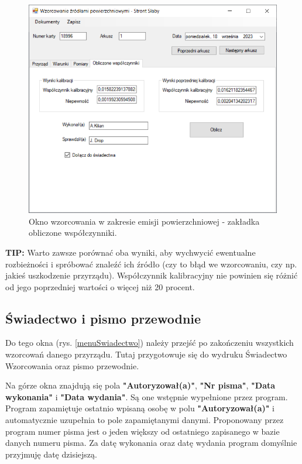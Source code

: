 	\begin{figure}[htb]
		\centering
		\includegraphics[width=\columnwidth]{obrazki/Wzorcowanie/emisja/wspolczynniki.png}
		\caption{Okno wzorcowania w zakresie emisji powierzchniowej - zakładka obliczone współczynniki.}
		\label{emisjaWspolczynniki}
	\end{figure}
	
	\textbf{TIP:} Warto zawsze porównać oba wyniki, aby wychwycić ewentualne rozbieżności i spróbować znaleźć ich źródło (czy to błąd we wzorcowaniu, czy np. jakieś uszkodzenie przyrządu). Współczynnik kalibracyjny nie powinien się różnić od jego poprzedniej wartości o więcej niż 20 procent.

\subsection{Świadectwo i pismo przewodnie}
\label{swiadectwo_pismo}

	Do tego okna (rys. \ref{menuSwiadectwo}) należy przejść po zakończeniu wszystkich wzorcowań danego przyrządu. Tutaj przygotowuje się do wydruku Świadectwo Wzorcowania oraz pismo przewodnie. 
	
	Na górze okna znajdują się pola \textbf{"Autoryzował(a)"}, \textbf{"Nr pisma"}, \textbf{"Data wykonania"} i \textbf{"Data wydania"}. Są one wstępnie wypełnione przez program. Program zapamiętuje ostatnio wpisaną osobę w polu \textbf{"Autoryzował(a)"} i automatycznie uzupełnia to pole zapamiętanymi danymi. Proponowany przez program numer pisma jest o jeden większy od ostatniego zapisanego w bazie danych numeru pisma. Za datę wykonania oraz datę wydania program domyślnie przyjmuję datę dzisiejszą.

